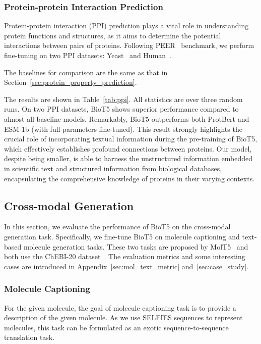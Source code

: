 \documentclass[11pt]{article}
\newcommand{\method}{{BioT5}}
\begin{document}
\subsubsection{Protein-protein Interaction Prediction}
\label{sec:ppi}
Protein-protein interaction (PPI) prediction plays a vital role in understanding protein functions and structures, as it aims to determine the potential interactions between pairs of proteins.
Following PEER~\citep{xu2022peer} benchmark, we perform fine-tuning on two PPI datasets: Yeast~\citep{guo2008using} and Human~\citep{pan2010large}.

The baselines for comparison are the same as that in Section~\ref{sec:protein_property_prediction}.

The results are shown in Table~\ref{tab:ppi}. All statistics are over three random runs.
On two PPI datasets, \method{} shows superior performance compared to almost all baseline models.
Remarkably, \method{} outperforms both ProtBert and ESM-1b (with full parameters fine-tuned).
This result strongly highlights the crucial role of incorporating textual information during the pre-training of BioT5, which effectively establishes profound connections between proteins.
Our model, despite being smaller, is able to harness the unstructured information embedded in scientific text and structured information from biological databases, encapsulating the comprehensive knowledge of proteins in their varying contexts. 

\subsection{Cross-modal Generation}
In this section, we evaluate the performance of \method{} on the cross-modal generation task.
Specifically, we fine-tune \method{} on molecule captioning and text-based molecule generation tasks.
These two tasks are proposed by MolT5~\citep{DBLP:conf/emnlp/EdwardsLRHCJ22} and both use the ChEBI-20 dataset~\citep{DBLP:conf/emnlp/EdwardsZJ21}.
The evaluation metrics and some interesting cases are introduced in Appendix~\ref{sec:mol_text_metric} and~\ref{sec:case_study}.
\subsubsection{Molecule Captioning}
\label{sec:mol2text}
For the given molecule, the goal of molecule captioning task is to provide a description of the given molecule.
As we use SELFIES sequences to represent molecules, this task can be formulated as an exotic sequence-to-sequence translation task.
\end{document}
